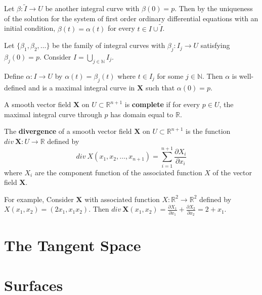	Let $\beta : \tilde{I} \to U$ be another integral curve with $\beta(0) = p$. Then by the uniqueness of the solution for the system of first order ordinary differential equations with an initial condition, $\beta(t) = \alpha(t)$ for every $ t \in I \cup \tilde{I}$.

	Let $\{\beta_1,\beta_2,\dots\}$ be the family of integral curves with $\beta_j : I_j \to U$ satisfying $\beta_j(0) = p$. Consider $I = \bigcup\limits_{j \in \mathbb{N}} I_j$.

	Define $\alpha : I \to U$ by $\alpha(t) = \beta_j(t)$ where $t \in I_j$ for some $j \in \mathbb{N}$. Then $\alpha$ is well-defined and is a maximal integral curve in $\mathbf{X}$ such that $\alpha(0) = p$.

\begin{definition}
	A smooth vector field $\mathbf{X}$ on $U \subset \mathbb{R}^{n+1}$ is \textbf{complete} if for every $p \in U$, the maximal integral curve through $p$ has domain equal to $\mathbb{R}$.
\end{definition}

\begin{definition}
	The \textbf{divergence} of a smooth vector field $\mathbf{X}$ on $U \subset \mathbb{R}^{n+1}$ is the function $div\ \mathbf{X} : U \to \mathbb{R}$ defined by
	\[ div\ X(x_1,x_2,\dots,x_{n+1}) = \sum_{i=1}^{n+1} \frac{\partial X_i}{\partial x_i} \]
	where $X_i$ are the component function of the associated function $X$ of the vector field $\mathbf{X}$.
\end{definition}

For example, Consider $\mathbf{X}$ with associated function $X : \mathbb{R}^2 \to \mathbb{R}^2$ defined by $X(x_1,x_2) = (2x_1,x_1x_2)$. Then $div\ \mathbf{X}(x_1,x_2) = \frac{\partial X_1}{\partial x_1} + \frac{\partial X_2}{\partial x_2} = 2 + x_1$.

\section{The Tangent Space}

\section{Surfaces}

